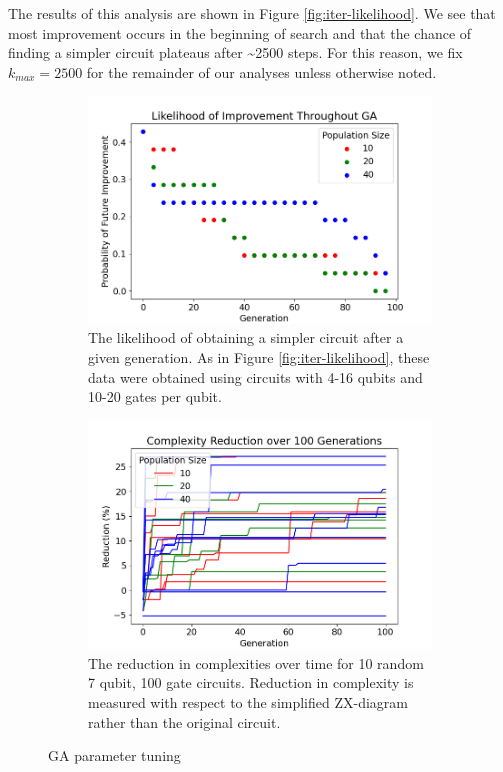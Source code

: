 The results of this analysis are shown in Figure \ref{fig:iter-likelihood}.
We see that most improvement occurs in the beginning of search and that the chance of finding a simpler circuit
plateaus after \textasciitilde 2500 steps.
For this reason, we fix $k_{max} = 2500$ for the remainder of our analyses unless otherwise noted.


\begin{figure}
\centering
\begin{subfigure}[t]{0.47\textwidth}
  \centering
  \includegraphics[width=\linewidth]{img/ga-likelihood.png}
  \caption{
    The likelihood of obtaining a simpler circuit after a given generation.
    As in Figure \ref{fig:iter-likelihood}, these data were obtained using circuits with 4-16 qubits and 10-20 gates per qubit.}
  \label{fig:ga-likelihood}
\end{subfigure}
\hfill
\begin{subfigure}[t]{0.47\textwidth}
  \centering
  \includegraphics[width=\linewidth]{img/7qb}
  \caption{
    The reduction in complexities over time for 10 random 7 qubit, 100 gate circuits.
    Reduction in complexity is measured with respect to the simplified ZX-diagram rather than the original circuit.
  }
  \label{fig:7qb}
\end{subfigure}
\caption{
  GA parameter tuning
}
\label{fig:ga-params}
\end{figure}


